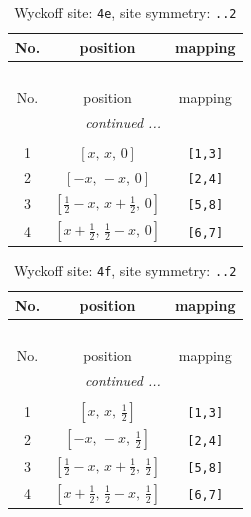 \documentclass[fleqn,8pt]{jsarticle}
\begin{document}
\begin{longtable}{ccc}
\caption{Wyckoff site: {\tt 4e}, site symmetry: {\tt ..2}}
 \\
 \hline \hline
No. & position & mapping \\ \hline \endfirsthead

\multicolumn{2}{l}{\tablename\ \thetable{}} \\
 \hline \hline
No. & position & mapping \\ \hline \endhead

 \hline \hline
\multicolumn{2}{r}{\footnotesize\it continued ...} \\ \endfoot

 \hline \hline
\multicolumn{2}{r}{} \\ \endlastfoot

1 & $\left[ x,\, x,\, 0 \right]$ & {\tt [1,3]} \\ \hline
2 & $\left[ - x,\, - x,\, 0 \right]$ & {\tt [2,4]} \\ \hline
3 & $\left[ \frac{1}{2} - x,\, x + \frac{1}{2},\, 0 \right]$ & {\tt [5,8]} \\ \hline
4 & $\left[ x + \frac{1}{2},\, \frac{1}{2} - x,\, 0 \right]$ & {\tt [6,7]} \\
\end{longtable}
\renewcommand{\arraystretch}{1.2}
\begin{longtable}{ccc}
\caption{Wyckoff site: {\tt 4f}, site symmetry: {\tt ..2}}
 \\
 \hline \hline
No. & position & mapping \\ \hline \endfirsthead

\multicolumn{2}{l}{\tablename\ \thetable{}} \\
 \hline \hline
No. & position & mapping \\ \hline \endhead

 \hline \hline
\multicolumn{2}{r}{\footnotesize\it continued ...} \\ \endfoot

 \hline \hline
\multicolumn{2}{r}{} \\ \endlastfoot

1 & $\left[ x,\, x,\, \frac{1}{2} \right]$ & {\tt [1,3]} \\ \hline
2 & $\left[ - x,\, - x,\, \frac{1}{2} \right]$ & {\tt [2,4]} \\ \hline
3 & $\left[ \frac{1}{2} - x,\, x + \frac{1}{2},\, \frac{1}{2} \right]$ & {\tt [5,8]} \\ \hline
4 & $\left[ x + \frac{1}{2},\, \frac{1}{2} - x,\, \frac{1}{2} \right]$ & {\tt [6,7]} \\
\end{longtable}
\end{document}
